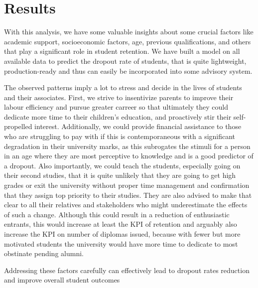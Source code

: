\documentclass[
  letterpaper,
  DIV=11,
  numbers=noendperiod]{scrartcl}
\begin{document}
\hypertarget{results}{%
\section{Results}\label{results}}

With this analysis, we have some valuable insights about some crucial
factors like academic support, socioeconomic factors, age, previous
qualifications, and others that play a significant role in student
retention. We have built a model on all available data to predict the
dropout rate of students, that is quite lightweight, production-ready
and thus can easily be incorporated into some advisory system.

The observed patterns imply a lot to stress and decide in the lives of
students and their associates. First, we strive to insentivize parents
to improve their labour efficiency and pursue greater carreer so that
ultimately they could dedicate more time to their children's education,
and proactively stir their self-propelled interest. Additionally, we
could provide financial assistance to those who are struggling to pay
with if this is contemporaneous with a significant degradation in their
university marks, as this subrogates the stimuli for a person in an age
where they are most perceptive to knowledge and is a good predictor of a
dropout. Also importantly, we could teach the students, especially going
on their second studies, that it is quite unlikely that they are going
to get high grades or exit the university without proper time management
and confirmation that they assign top priority to their studies. They
are also advised to make that clear to all their relatives and
stakeholders who might underestimate the effects of such a change.
Although this could result in a reduction of enthusiastic entrants, this
would increase at least the KPI of retention and arguably also increase
the KPI on number of diplomas issued, because with fewer but more
motivated students the university would have more time to dedicate to
most obstinate pending alumni.

Addressing these factors carefully can effectively lead to dropout rates
reduction and improve overall student outcomes


\printbibliography
\end{document}
